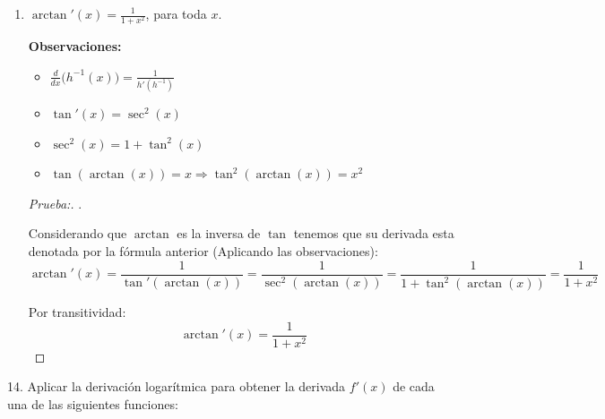 \documentclass[12pt]{article}
\begin{document}
\begin{enumerate}[\hspace{9px} a)]
        \begin{proof}[Prueba:]
            . \medskip

            Considerando que $\arccos$ es la inversa de $\cos$ tenemos que su derivada esta denotada por la f\'ormula anterior (Aplicando las observaciones):
            \[\arccos'(x) = \frac{1}{\cos'(\arccos(x))} = \frac{1}{-\sin(\arccos(x))}\]

            Despejando \(\sin(x)\) de \(\sin^2(x)+\cos^2(x)=1\), tenemos que: \(\sin(x) = \sqrt{1-\cos^2(x)}\). Sustituyendo lo obtenido en la ecuaci\'on:

            \[-\frac{1}{\sin(\arccos(x))} = -\frac{1}{\sqrt{1-\cos^2(\arcsin(x))}} = -\frac{1}{\sqrt{1-x^2}}\]

            Finalmente, por transitividad:
            \[\arccos'(x) = -\frac{1}{\sqrt{1-x^2}}\]
        \end{proof}

    \item \(\arctan'(x)=\displaystyle\frac{1}{1+x^2}\), para toda $x$. \bigskip
        
        \textbf{Observaciones:}
        \begin{itemize}
            \item \(\displaystyle\frac{d}{dx}\big(h^{-1}(x)\big) = \frac{1}{h'(h^{-1})}\)
            \item \(\tan'(x) = \sec^2(x)\)
            \item \(\sec^2(x)=1+\tan^2(x)\)
            \item \(\tan(\arctan(x))=x \Longrightarrow \tan^2(\arctan(x))=x^2\)
        \end{itemize}

        \begin{proof}[Prueba:]
            . \medskip

            Considerando que $\arctan$ es la inversa de $\tan$ tenemos que su derivada esta denotada por la f\'ormula anterior (Aplicando las observaciones):
            \[\arctan'(x) = \frac{1}{\tan'(\arctan(x))} = \frac{1}{\sec^2(\arctan(x))} = \frac{1}{1+\tan^2(\arctan(x))} = \frac{1}{1+x^2}\]

            Por transitividad:
            \[\arctan'(x) = \frac{1}{1+x^2}\]
        \end{proof}

\end{enumerate}

14. Aplicar la derivaci\'on logar\'itmica para obtener la derivada $f'(x)$ de cada una de las siguientes funciones:
\end{document}
